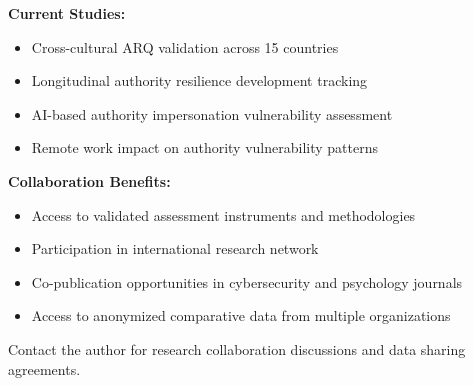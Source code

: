 \documentclass[11pt,a4paper]{article}
\begin{document}
\textbf{Current Studies:}
\begin{itemize}
\item Cross-cultural ARQ validation across 15 countries
\item Longitudinal authority resilience development tracking
\item AI-based authority impersonation vulnerability assessment
\item Remote work impact on authority vulnerability patterns
\end{itemize}

\textbf{Collaboration Benefits:}
\begin{itemize}
\item Access to validated assessment instruments and methodologies
\item Participation in international research network
\item Co-publication opportunities in cybersecurity and psychology journals
\item Access to anonymized comparative data from multiple organizations
\end{itemize}

Contact the author for research collaboration discussions and data sharing agreements.
\end{document}

